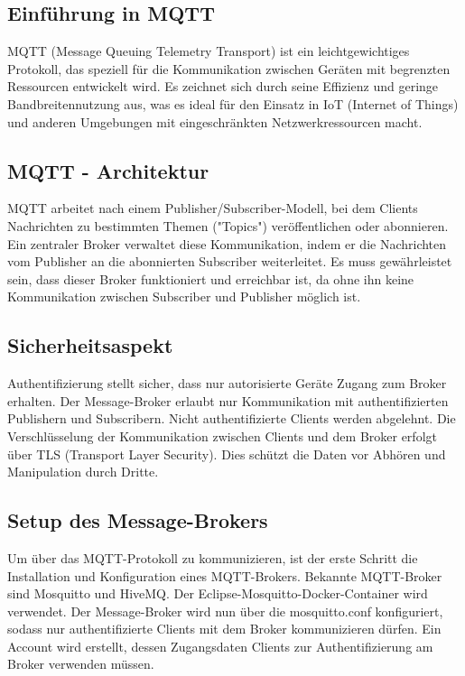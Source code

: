 
\subsection{Einführung in MQTT}
MQTT (Message Queuing Telemetry Transport) ist ein leichtgewichtiges Protokoll, das speziell für die Kommunikation zwischen Geräten mit begrenzten Ressourcen entwickelt wird. Es zeichnet sich durch seine Effizienz und geringe Bandbreitennutzung aus, was es ideal für den Einsatz in IoT (Internet of Things) und anderen Umgebungen mit eingeschränkten Netzwerkressourcen macht.

\subsection{MQTT - Architektur}
MQTT arbeitet nach einem Publisher/Subscriber-Modell, bei dem Clients Nachrichten zu bestimmten Themen ("Topics") veröffentlichen oder abonnieren. Ein zentraler Broker verwaltet diese Kommunikation, indem er die Nachrichten vom Publisher an die abonnierten Subscriber weiterleitet. Es muss gewährleistet sein, dass dieser Broker funktioniert und erreichbar ist, da ohne ihn keine Kommunikation zwischen Subscriber und Publisher möglich ist.

\subsection{Sicherheitsaspekt}
Authentifizierung stellt sicher, dass nur autorisierte Geräte Zugang zum Broker erhalten. Der Message-Broker erlaubt nur Kommunikation mit authentifizierten Publishern und Subscribern. Nicht authentifizierte Clients werden abgelehnt. Die Verschlüsselung der Kommunikation zwischen Clients und dem Broker erfolgt über TLS (Transport Layer Security). Dies schützt die Daten vor Abhören und Manipulation durch Dritte.

\subsection{Setup des Message-Brokers}
Um über das MQTT-Protokoll zu kommunizieren, ist der erste Schritt die Installation und Konfiguration eines MQTT-Brokers. Bekannte MQTT-Broker sind Mosquitto und HiveMQ. Der Eclipse-Mosquitto-Docker-Container wird verwendet. Der Message-Broker wird nun über die mosquitto.conf konfiguriert, sodass nur authentifizierte Clients mit dem Broker kommunizieren dürfen. Ein Account wird erstellt, dessen Zugangsdaten Clients zur Authentifizierung am Broker verwenden müssen.

